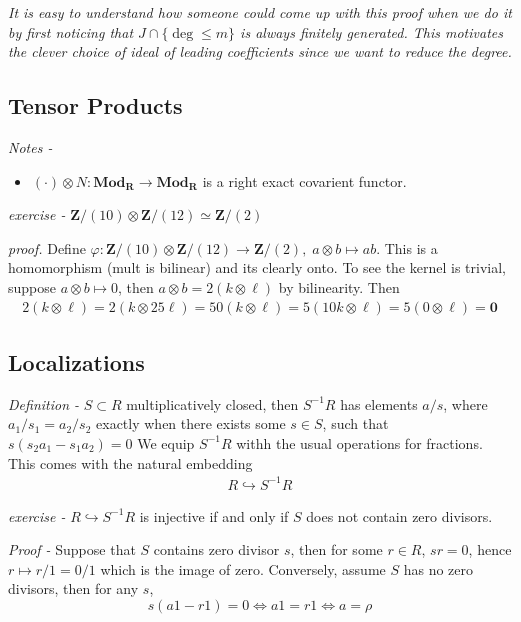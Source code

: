 \documentclass[11pt]{article}
\theoremstyle{definition}
\newcommand{\set}[1]{\{#1\}}
\begin{document}
    \emph{It is easy to understand how someone could come up with this proof when we do it by first noticing that \(J \cap \set{\deg \leq m}\) is always finitely generated.
    This motivates the clever choice of ideal of leading coefficients since we want to reduce the degree.}

    \subsection{Tensor Products}

    \emph{Notes - }
    \begin{itemize}
        \item \((\cdot) \otimes N: \textbf{Mod}_\mathbf{R} \to \textbf{Mod}_\mathbf{R}\) is a right exact covarient functor.
    \end{itemize}

    \emph{exercise - } \(\mathbf{Z}/(10)\otimes \mathbf{Z}/(12) \simeq \mathbf{Z}/(2)\)

    \emph{proof.} Define \(\varphi: \mathbf{Z}/(10)\otimes \mathbf{Z}/(12) \to \mathbf{Z}/(2), \; a\otimes b \mapsto ab\). This is a homomorphism (mult is bilinear) and its clearly onto.
    To see the kernel is trivial, suppose \(a \otimes b \mapsto 0\), then \(a \otimes b = 2 (k \otimes \ell)\) by bilinearity. Then
    \begin{align*}
        2 (k \otimes \ell) = 2 (k \otimes 25\ell) = 50 (k \otimes \ell) = 5 (10k \otimes \ell) = 5(0 \otimes \ell) = \mathbf{0}
    \end{align*}

    \subsection{Localizations}

    \emph{Definition - } \(S \subset R\) multiplicatively closed, then \(S^{-1}R\) has elements \(a/s\), where \(a_1/s_1 = a_2/s_2\) exactly when there exists some \(s \in S\), such that \(s(s_2a_1 - s_1a_2) = 0\)
    We equip \(S^{-1}R\) withh the usual operations for fractions. This comes with the natural embedding
    \begin{align*}
        R \hookrightarrow S^{-1}R
    \end{align*}

    \emph{exercise - } \(R \hookrightarrow S^{-1}R\) is injective if and only if \(S\) does not contain zero divisors.

    \emph{Proof - } Suppose that \(S\) contains zero divisor \(s\), then for some \(r \in R\), \(sr = 0\), hence \(r \mapsto r/1 = 0/1\) which is the image of zero. Conversely, assume \(S\) has no zero divisors, then for any \(s\),
    \[s(a1 - r1) = 0 \iff a1 = r1 \iff a = \rho\]
\end{document}
